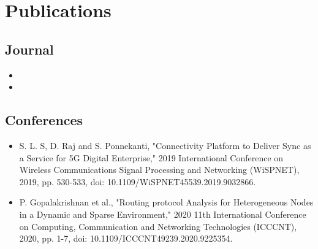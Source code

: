 \chapter{Publications}\label{chapter:publication}
\setlength{\parindent}{4em}
\setlength{\parskip}{1em}
\section{Journal}
\begin{itemize}
    \item 
    \item 
\end{itemize}
\section{Conferences}
\begin{itemize}
    \item \cite{Ref1} S. L. S, D. Raj and S. Ponnekanti, "Connectivity Platform to Deliver Sync as a Service for 5G Digital Enterprise," 2019 International Conference on Wireless Communications Signal Processing and Networking (WiSPNET), 2019, pp. 530-533, doi: 10.1109/WiSPNET45539.2019.9032866.
    \item \cite{Ref2} P. Gopalakrishnan et al., "Routing protocol Analysis for Heterogeneous Nodes in a Dynamic and Sparse Environment," 2020 11th International Conference on Computing, Communication and Networking Technologies (ICCCNT), 2020, pp. 1-7, doi: 10.1109/ICCCNT49239.2020.9225354.
\end{itemize}